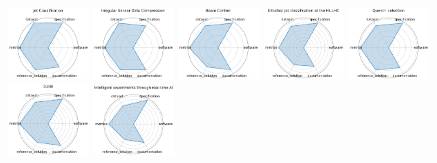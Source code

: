 
\begin{figure}[ht!]
\centering
\includegraphics[width=0.1900\textwidth]{images/jet_classification_radar.pdf}
\includegraphics[width=0.1900\textwidth]{images/irregular_sensor_data_compression_radar.pdf}
\includegraphics[width=0.1900\textwidth]{images/beam_control_radar.pdf}
\includegraphics[width=0.1900\textwidth]{images/ultrafast_jet_classification_at_the_hl-lhc_radar.pdf}
\includegraphics[width=0.1900\textwidth]{images/quench_detection_radar.pdf}
\\[1ex]
\includegraphics[width=0.1900\textwidth]{images/dune_radar.pdf}
\includegraphics[width=0.1900\textwidth]{images/intelligent_experiments_through_real-time_ai_radar.pdf}

\end{figure}
